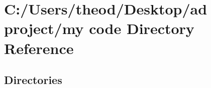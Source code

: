 \section{C\+:/\+Users/theod/\+Desktop/ad project/my code Directory Reference}
\label{dir_c8f4b456396b9e0b02b864b7fcfd59b8}
\subsection*{Directories}
\begin{DoxyCompactItemize}
\end{DoxyCompactItemize}
